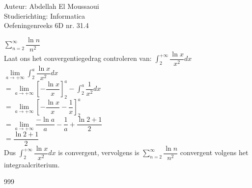 \documentclass[a4paper]{article}
\begin{document}
  
\noindent \large Auteur: Abdellah El Moussaoui \\
\noindent \large Studierichting: Informatica\\
\noindent \large Oefeningenreeks 6D nr. 31.4\\

\medskip

\normalsize

$\displaystyle\sum_{n = 2}^{\infty}\dfrac{\ln n}{n^2}$\\

Laat ons het convergentiegedrag controleren van: $\displaystyle\int^{+\infty}_2\dfrac{\ln x}{x^2}dx$\\

$ \lim\limits_{a\to+\infty} \displaystyle\int^a_2 \dfrac{\ln x}{x^2}dx$\\

$=\lim\limits_{a\to+\infty} \left[-\dfrac{\ln x}{x}\right]^a_2-\displaystyle\int^a_2\dfrac{1}{x^2}dx$\\

$= \lim\limits_{a\to+\infty} \left[-\dfrac{\ln x}{x} - \dfrac{1}{x}\right]^a_2$\\

$= \lim\limits_{a\to+\infty} \dfrac{-\ln a}{a}-\dfrac{1}{a} + \dfrac{\ln2+1}{2}$\\

$= \dfrac{\ln2+1}{2}$\\

Dus $\displaystyle\int^{+\infty}_2\dfrac{\ln x}{x^2}dx$ is convergent, vervolgens is $\displaystyle\sum_{n = 2}^{\infty}\dfrac{\ln n}{n^2}$ convergent volgens het integraalcriterium.\\


\begin{thebibliography}{999}
\end{thebibliography}
\end{document}
